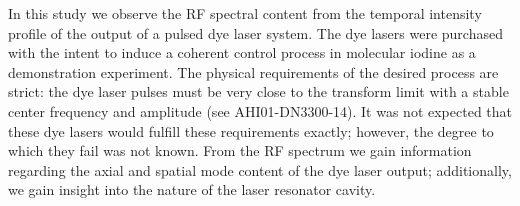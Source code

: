 In this study we observe the RF spectral content from the temporal intensity profile of the output of a pulsed dye laser system. The dye lasers were purchased with the intent to induce a coherent control process in molecular iodine as a demonstration experiment. The physical requirements of the desired process are strict: the dye laser pulses must be very close to the transform limit with a stable center frequency and amplitude (see AHI01-DN3300-14). It was not expected that these dye lasers would fulfill these requirements exactly; however, the degree to which they fail was not known. From the RF spectrum we gain information regarding the axial and spatial mode content of the dye laser output; additionally, we gain insight into the nature of the laser resonator cavity.
